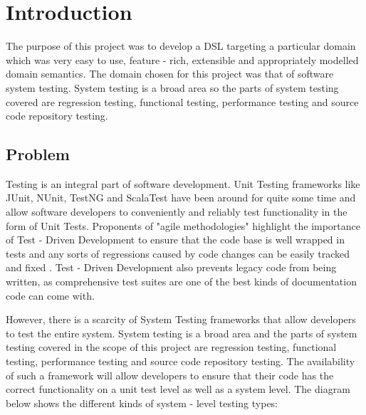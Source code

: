 \section{Introduction}

\noindent
The purpose of this project was to develop a DSL targeting a particular domain which was very easy to use, feature - rich, extensible and appropriately modelled domain semantics. The domain chosen for this project was that of software system testing. System testing is a broad area so the parts of system testing covered are regression testing, functional testing, performance testing and source code repository testing.


\subsection{Problem}
Testing is an integral part of software development. Unit Testing frameworks like JUnit, NUnit, TestNG and ScalaTest have been around for quite some time and allow software developers to conveniently and reliably test functionality in the form of Unit Tests. Proponents of "agile methodologies" highlight the importance of Test - Driven Development to ensure that the code base is well wrapped in tests and any sorts of regressions caused by code changes can be easily tracked and fixed \cite{tdd}. Test - Driven Development also prevents legacy code from being written, as comprehensive test suites are one of the best kinds of documentation code can come with.
\bigskip

\noindent
However, there is a scarcity of System Testing frameworks that allow developers to test the entire system. System testing is a broad area and the parts of system testing covered in the scope of this project are regression testing, functional testing, performance testing and source code repository testing. The availability of such a framework will allow developers to ensure that their code has the correct functionality on a unit test level as well as a system level. The diagram below shows the different kinds of system - level testing types:
\bigskip

